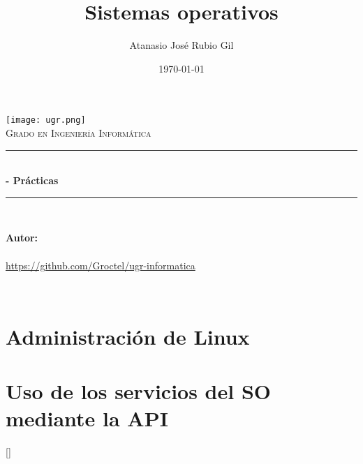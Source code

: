 \documentclass[10pt, spanish]{report}
\title{%
	Sistemas operativos
}
\author{%
	Atanasio José Rubio Gil
}
\date{%
	\today
}
\makeatletter
\let\thetitle\@title
\let\theauthor\@author
\let\thedate\@date
\makeatother
\begin{document}
\begin{titlepage}
	\centering
	\texttt{[image: ugr.png]}\\
	\textsc{\Huge Grado en Ingeniería Informática}\\[0.5 cm]
	\rule{\linewidth}{0.2 mm}\\[0.2 cm]
	{\huge\bfseries\thetitle- Prácticas}\\
		\rule{\linewidth}{0.2 mm}\\[1 cm]

	\begin{center} \large
		\textbf{Autor:}\\
		\theauthor\\
		{\url{https://github.com/Groctel/ugr-informatica}}\\[1 cm]
	\end{center}

	{\large \thedate}\\[1.5 cm]
	{\doclicenseThis}
	\vfill
\end{titlepage}

\tableofcontents
\pagebreak

\chapter{Administración de Linux}
 \pagebreak
 \pagebreak
 \pagebreak


\chapter{Uso de los servicios del SO mediante la API}
 \pagebreak
 \pagebreak


\setcounter{chapter}{0}
[]
\renewcommand{\thesubsection}{\MakeUppercase{\alph{chapter}}.\arabic{subsection}}

 \pagebreak
   \pagebreak
    \pagebreak

\end{document}
